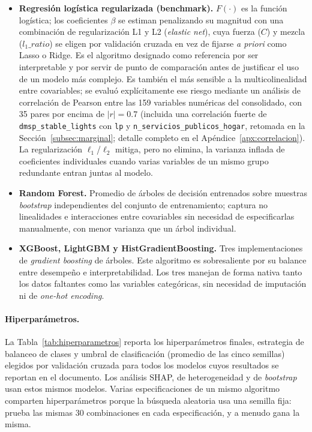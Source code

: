 \documentclass[12pt, letterpaper]{article}
\begin{document}
\begin{itemize}
  \item \textbf{Regresión logística regularizada (benchmark).} $F(\cdot)$
  es la función logística; los coeficientes $\beta$ se estiman
  penalizando su magnitud con una combinación de regularización L1 y L2
  (\emph{elastic net}), cuya fuerza ($C$) y mezcla ($l_1\_ratio$) se
  eligen por validación cruzada en vez de fijarse \emph{a priori} como
  Lasso o Ridge. Es el algoritmo designado como referencia por ser
  interpretable y por servir de punto de comparación antes de
  justificar el uso de un modelo más complejo. Es también el más sensible
  a la multicolinealidad entre covariables; se evaluó explícitamente ese
  riesgo mediante un análisis de correlación de Pearson entre las 159
  variables numéricas del consolidado, con 35 pares por encima de
  $|r|=0.7$ (incluida una correlación fuerte de \texttt{dmsp\_stable\_lights}
  con \texttt{lp} y \texttt{n\_servicios\_publicos\_hogar}, retomada en la
  Sección~\ref{subsec:marginal}; detalle completo en el
  Apéndice~\ref{apx:correlacion}). La regularización $\ell_1$/$\ell_2$
  mitiga, pero no elimina, la varianza inflada de coeficientes individuales
  cuando varias variables de un mismo grupo redundante entran juntas al
  modelo.
  \item \textbf{Random Forest.} Promedio de árboles de decisión
  entrenados sobre muestras \emph{bootstrap} independientes del conjunto
  de entrenamiento; captura no linealidades e interacciones entre
  covariables sin necesidad de especificarlas manualmente, con menor
  varianza que un árbol individual.
  \item \textbf{XGBoost, LightGBM y HistGradientBoosting.} Tres
  implementaciones de \emph{gradient boosting} de árboles. Este algoritmo
  es sobresaliente por su balance entre desempeño e interpretabilidad. Los
  tres manejan de forma nativa tanto los datos faltantes como las
  variables categóricas, sin necesidad de imputación ni de
  \emph{one-hot encoding}.
\end{itemize}

\paragraph{Hiperparámetros.} La Tabla~\ref{tab:hiperparametros} reporta los hiperparámetros finales,
estrategia de balanceo de clases y umbral de clasificación (promedio de las
cinco semillas) elegidos por validación cruzada para
todos los modelos cuyos resultados se reportan en el documento. Los
análisis SHAP, de heterogeneidad y de \emph{bootstrap} usan estos mismos
modelos. Varias especificaciones de un mismo algoritmo comparten
hiperparámetros porque la búsqueda aleatoria usa una semilla fija: prueba
las mismas 30 combinaciones en cada especificación, y a menudo gana la
misma.
\end{document}
